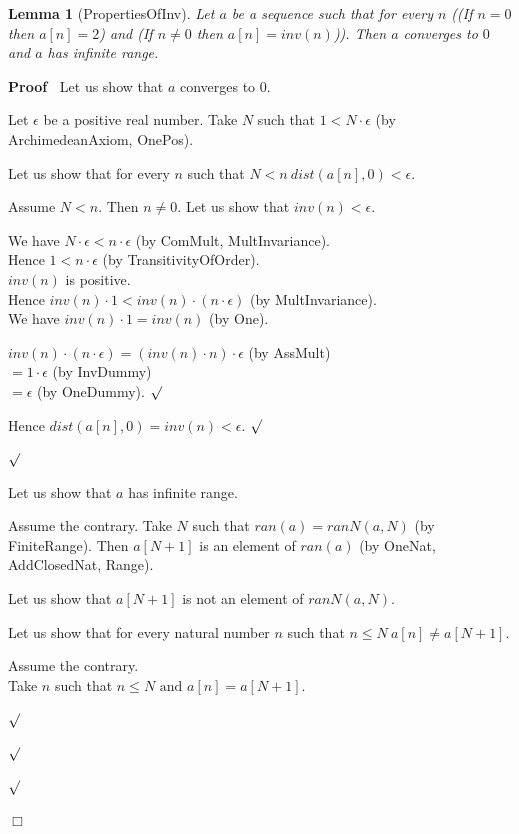 \documentclass{article}
\newenvironment{forthel}{\begin{leftbar}}{\end{leftbar}}
\newenvironment{proof}{\noindent\textbf{Proof\ }}{\hspace*{\fill}$\Box$\medskip}
\newenvironment{subproof}{\begin{list}{}{}
		\item[\text{Proof}]}{\hfill $\surd$ \end{list}}
\newtheorem{lemma}{Lemma}
\newcommand{\dotequal}{=}
\begin{document}
\begin{forthel}
	\begin{lemma}[PropertiesOfInv]
		Let $a$ be a sequence such that for every $n$
		((If $n = 0$ then $a[n] = 2$) and (If $n \neq 0$ then $a[n] = inv(n)$)).
		Then $a$ converges to $0$ and $a$ has infinite range.
	\end{lemma}
	\begin{proof}
		Let us show that $a$ converges to $0$.
		\begin{subproof}
			Let $\epsilon$ be a positive real number. 
			Take $N$ such that $1 < N \cdot \epsilon$ (by ArchimedeanAxiom, OnePos).
	
			Let us show that for every $n$ such that $N < n \ dist(a[n],0) < \epsilon$.
			\begin{subproof}
				Assume $N < n$. Then $n \neq 0$.
				Let us show that $inv(n) < \epsilon$.
				\begin{subproof}
					We have $N \cdot \epsilon < n \cdot \epsilon$ (by ComMult, MultInvariance).\\
					Hence $1 < n \cdot \epsilon$ (by TransitivityOfOrder).\\
					$inv(n)$ is positive.\\
					Hence $inv(n) \cdot 1 < inv(n) \cdot (n \cdot \epsilon)$ (by MultInvariance).\\
					We have $inv(n) \cdot 1 = inv(n)$ (by One).
				
					$inv(n) \cdot (n \cdot \epsilon) \dotequal (inv(n) \cdot n) \cdot \epsilon$ (by AssMult)\\
					$\dotequal 1 \cdot \epsilon$ (by InvDummy)\\
					$\dotequal \epsilon$ (by OneDummy).
				\end{subproof}
				Hence $dist(a[n],0) = inv(n) < \epsilon$.
			\end{subproof}
		\end{subproof}
		Let us show that $a$ has infinite range.
		\begin{subproof}
			Assume the contrary.
			Take $N$ such that $ran(a) = ranN(a,N)$ (by FiniteRange).
			Then $a[N + 1]$ is an element of $ran(a)$ (by OneNat, AddClosedNat, Range).
			
			Let us show that $a[N + 1]$ is not an element of $ranN(a,N)$.
			\begin{subproof}
				Let us show that for every natural number $n$ such that $n \leq N \ a[n] \neq a[N + 1]$.
				\begin{subproof}
					Assume the contrary.\\
					Take $n$ such that $n \leq N \text{ and } a[n] = a[N + 1]$.
					

\end{subproof}
\end{subproof}
\end{subproof}
\end{proof}
\end{forthel}
\end{document}
